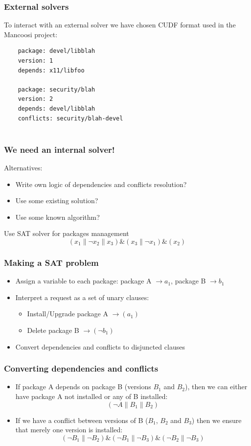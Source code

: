 \documentclass{beamer}
\begin{document}
\begin{frame}[fragile]
\frametitle{External solvers}
To interact with an external solver we have chosen CUDF format used in the
Mancoosi project:
\bigskip
{\small
	\begin{verbatim}
	package: devel/libblah
	version: 1
	depends: x11/libfoo

	package: security/blah
	version: 2
	depends: devel/libblah
	conflicts: security/blah-devel
	
	\end{verbatim}
}
\end{frame}

\begin{frame}
\frametitle{We need an internal solver!}

Alternatives:
\begin{itemize}
  \item Write own logic of dependencies and conflicts resolution?
  \pause
  \item Use some existing solution?
  \pause
  \item Use some known algorithm?
  \pause
\end{itemize}
\bigskip
{\large Use SAT solver for packages management}
\bigskip
\[(x_1 \| \neg x_2 \| x_3) \& (x_3 \| \neg x_1) \& (x_2)\]
\end{frame}

\begin{frame}
\frametitle{Making a SAT problem}
\begin{itemize}
  \item Assign a variable to each package: 
  package A $\to a_1$, package B $\to b_1$
  \item Interpret a request as a set of unary clauses:
  \begin{itemize}
    \item Install/Upgrade package A $\to (a_1)$
    \item Delete package B $\to (\neg b_1)$
  \end{itemize}
  \item Convert dependencies and conflicts to disjuncted clauses
\end{itemize}

\end{frame}

\begin{frame}
\frametitle{Converting dependencies and conflicts}
\begin{itemize}
  \item If package A depends on package B (versions $B_1$ and $B_2$), then we
  can either have package A not installed or any of B installed:
  \bigskip
\[(\neg A \| B_1 \| B_2)\]
\pause
  \item If we have a conflict between versions of B ($B_1$, $B_2$ and $B_3$)
 then we ensure that merely one version is installed:
  \bigskip
\[(\neg B_1 \| \neg B_2) \& (\neg B_1 \| \neg B_3) \& (\neg B_2 \| \neg
B_3)\]
\end{itemize}
\end{frame}
\end{document}
